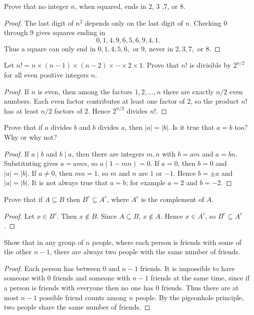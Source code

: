 \documentclass[12pt]{article}
\begin{document}
\begin{problem}
Prove that no integer $n$, when squared, ends in $2$, $3$ ,$7$, or $8$.
\begin{proof}
The last digit of $n^2$ depends only on the last digit of $n$. Checking $0$ through $9$ gives squares ending in
\[
0,1,4,9,6,5,6,9,4,1.
\]
Thus a square can only end in $0,1,4,5,6,$ or $9$, never in $2,3,7,$ or $8$.
\end{proof}
\end{problem}

\begin{problem}
Let $n! = n \times (n-1) \times (n-2) \times \cdots \times 2 \times 1$. Prove that $n!$ is divisible by $2^{n/2}$ for all even positive integers $n$.
\begin{proof}
If $n$ is even, then among the factors $1,2,\ldots,n$ there are exactly $n/2$ even numbers. Each even factor contributes at least one factor of $2$, so the product $n!$ has at least $n/2$ factors of $2$. Hence $2^{n/2}$ divides $n!$.
\end{proof}
\end{problem}

\begin{problem}
Prove that if $a$ divides $b$ and $b$ divides $a$, then $|a| = |b|$. Is it true that $a = b$ too? Why or why not?
\begin{proof}
If $a\mid b$ and $b\mid a$, then there are integers $m,n$ with $b=am$ and $a=bn$. Substituting gives $a=amn$, so $a(1-mn)=0$. If $a=0$, then $b=0$ and $|a|=|b|$. If $a\ne 0$, then $mn=1$, so $m$ and $n$ are $1$ or $-1$. Hence $b=\pm a$ and $|a|=|b|$. It is not always true that $a=b$; for example $a=2$ and $b=-2$.
\end{proof}
\end{problem}

\begin{problem}
Prove that if $A \subseteq B$ then $B^c \subseteq A^c$, where $A^c$ is the complement of $A$.
\begin{proof}
Let $x\in B^c$. Then $x\notin B$. Since $A\subseteq B$, $x\notin A$. Hence $x\in A^c$, so $B^c\subseteq A^c$.
\end{proof}
\end{problem}

\begin{problem}
Show that in any group of $n$ people, where each person is friends with some of the other $n-1$, there are always two people with the same number of friends.
\begin{proof}
Each person has between $0$ and $n-1$ friends. It is impossible to have someone with $0$ friends and someone with $n-1$ friends at the same time, since if a person is friends with everyone then no one has $0$ friends. Thus there are at most $n-1$ possible friend counts among $n$ people. By the pigeonhole principle, two people share the same number of friends.
\end{proof}
\end{problem}
\end{document}
